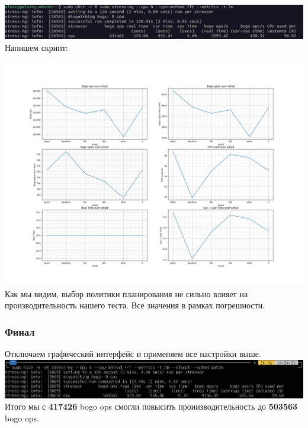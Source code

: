 \includegraphics[width=\textwidth]{image/idle.png}
Напишем скрипт:

\includegraphics[width=\textwidth]{cpu/image/sched-tesing.png}
Как мы видим, выбор политики планирования не сильно влияет на производительность нашего теста. Все значения в рамках погрешности. 
\subsubsection{Финал}
Отключаем графический интерфейс и применяем все настройки выше. \\
\includegraphics[width=\textwidth]{cpu/image/final-cpu.png}
Итого мы с \textbf{417426} bogo ops смогли повысить проиизводительность до \textbf{503563} bogo ops.
